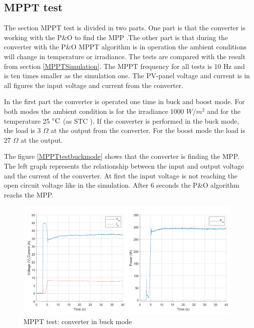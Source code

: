 \subsection{MPPT test}
The section MPPT test is divided in two parts. One part is that the converter is working with the P\&O to find the MPP .The other part is that during the converter with the P\&O MPPT algorithm is in operation the ambient conditions will change in temperature or irradiance. The tests are compared with the result from section \ref{MPPTSimulation}. The MPPT frequency for all tests is 10 Hz and is ten times smaller as the simulation one. The PV-panel voltage and current is in all figures the input voltage and current from the converter.

In the first part the converter is operated one time in buck and boost mode. For both modes the ambient condition is for the irradiance 1000 $W /m^2$ and for the temperature 25 $\decC$ (as STC ). If the converter is performed in the buck mode, the load is 3 $\Omega$ at the output from the converter. For the boost mode the load is 27 $\Omega$ at the output.

The figure \ref{MPPTtestbuckmode} shows that the converter is finding the MPP. The left graph represents the relationship between the input and output voltage and the current of the converter. At first the input voltage is not reaching the open circuit voltage like in the simulation.  After 6 seconds the P\&O algorithm reachs the MPP. 

\begin{figure}[H]
	\begin{center}
		\includegraphics[width=1\textwidth]{../Pictures/P1/Test/Buck_mode_MPPT_Vin_Iin_Pin}
		\caption{MPPT test: converter in buck mode}
		\label{MPPTtestbuckmode1}
	\end{center}	
\end{figure}

